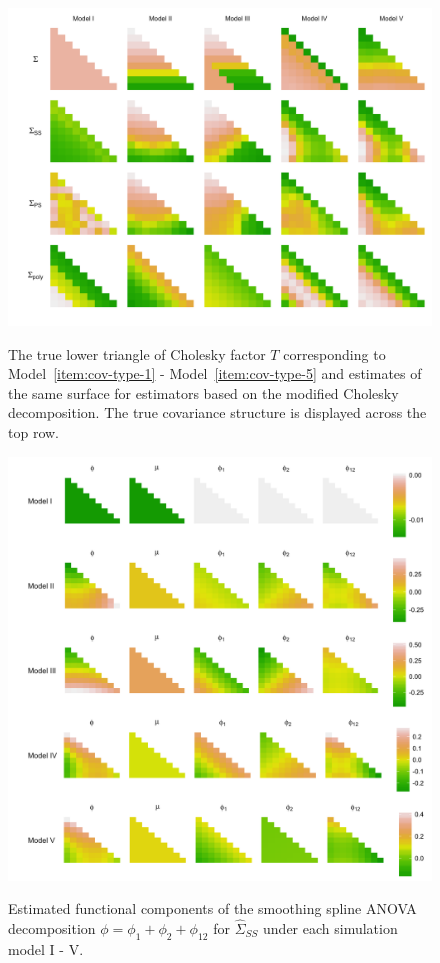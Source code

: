 \begin{figure}[H] 
\centering
\caption{The true lower triangle of Cholesky factor $T$ corresponding to Model~\ref{item:cov-type-1} - Model~\ref{item:cov-type-5} and estimates of the same surface for estimators based on the modified Cholesky decomposition. The true covariance structure is displayed across the top row.}
  \includegraphics[width = 1\textwidth]{img/chapter-4/cholesky-estimate-lattice}
  \label{fig:chol-estimate-lattice}
\end{figure}

%

\begin{figure}[H] 
\caption{Estimated functional components of the smoothing spline ANOVA decomposition $\phi = \phi_1 + \phi_2 + \phi_{12}$ for $\hat{\Sigma}_{SS}$ under each simulation model I - V.}
  \includegraphics[width = \textwidth]{img/chapter-4/ssanova-estimate-lattice} \label{fig:ssanova-component-lattice}
\end{figure}

